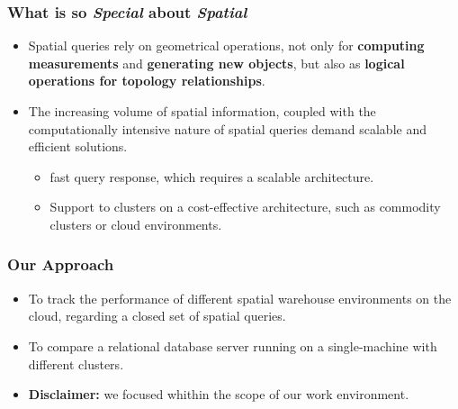 \documentclass[hyperref={pdfpagelabels=true}]{beamer}
\begin{document}
\begin{frame}
\frametitle{What is so \textit{Special} about \textit{Spatial}}
    \begin{itemize}
    \item<1->Spatial queries rely on geometrical operations, not only for \textbf{computing measurements} and \textbf{generating new objects}, but also as \textbf{logical operations for topology relationships}.%
    \item<2->The increasing volume of spatial information, coupled with the computationally intensive nature of spatial queries demand scalable and efficient solutions.
    \begin{itemize}
      \item<3->fast query response, which requires a scalable architecture.
      \item<3->Support to clusters on a cost-effective architecture, such as commodity clusters or cloud environments.
     \end{itemize}
    \end{itemize}      
\end{frame}
 
\begin{frame}
\frametitle{Our Approach}
    \begin{itemize}
      \item<1->To track the performance of different spatial warehouse environments on the cloud, regarding a closed set of spatial queries.
      \item<2->To compare a relational database server running on a single-machine with different clusters.%
      \item<3->\textbf{Disclaimer:} we focused whithin the scope of our work environment.%
    \end{itemize}
\end{frame}
\end{document}
